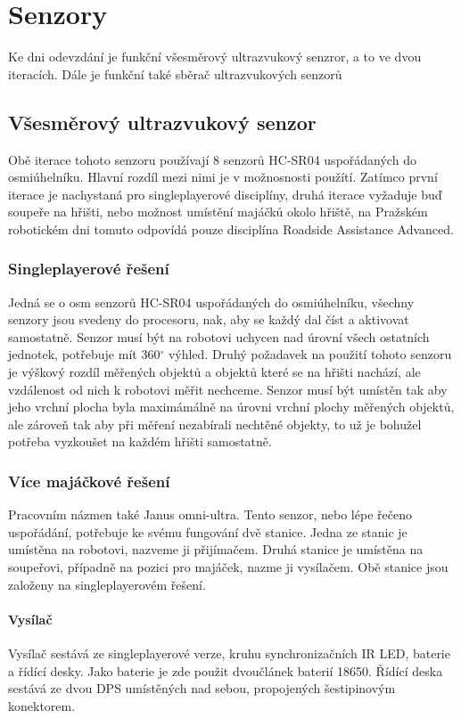 \chapter{Senzory}
Ke dni odevzdání je funkční všesměrový ultrazvukový senzror, a to ve dvou iteracích.
Dále je funkční také sběrač ultrazvukových senzorů

\section{Všesměrový ultrazvukový senzor}
Obě iterace tohoto senzoru používají 8 senzorů HC-SR04 uspořádaných do osmiúhelníku.
Hlavní rozdíl mezi nimi je v možnosnosti použítí.
Zatímco první iterace je nachystaná pro singleplayerové disciplíny, druhá iterace vyžaduje buď soupeře na hřišti, nebo možnost umístění majáčků okolo hřiště, na Pražském robotickém dni tomuto odpovídá pouze disciplína Roadside Assistance Advanced.

\subsection{Singleplayerové řešení}
Jedná se o osm senzorů HC-SR04 uspořádaných do osmiúhelníku, všechny senzory jsou svedeny do procesoru, nak, aby se každý dal číst a aktivovat samostatně.
Senzor musí být na robotovi uchycen nad úrovní všech ostatních jednotek, potřebuje mít 360$^{\circ}$ výhled.
Druhý požadavek na použití tohoto senzoru je výškový rozdíl měřených objektů a objektů které se na hřišti nachází, ale vzdálenost od nich k robotovi měřit nechceme.
Senzor musí být umístěn tak aby jeho vrchní plocha byla maximámálně na úrovni vrchní plochy měřených objektů, ale zároveň tak aby při měření nezabírali nechtěné objekty, to už je bohužel potřeba vyzkoušet na každém hřišti samostatně.

\subsection{Více majáčkové řešení}
Pracovním názmen také Janus omni-ultra.
Tento senzor, nebo lépe řečeno uspořádání, potřebuje ke svému fungování dvě stanice.
Jedna ze stanic je umístěna na robotovi, nazveme ji přijímačem.
Druhá stanice je umístěna na soupeřovi, případně na pozici pro majáček, nazme ji vysílačem.
Obě stanice jsou založeny na singleplayerovém řešení.

\subsubsection{Vysílač}
Vysílač sestává ze singleplayerové verze, kruhu synchronizačních IR LED, baterie a řídící desky.
Jako baterie je zde použit dvoučlánek baterií 18650.
Řídící deska sestává ze dvou DPS umístěných nad sebou, propojených šestipinovým konektorem.

